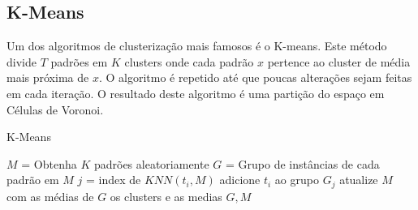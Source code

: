 \subsection{K-Means}
\label{subsec:teoria-kmeans}

Um dos algoritmos de clusterização mais famosos é o K-means. Este método divide $T$ padrões em $K$ clusters onde cada padrão $x$ pertence ao cluster de média mais próxima de $x$. O algoritmo é repetido até que poucas alterações sejam feitas em cada iteração. O resultado deste algoritmo é uma partição do espaço em Células de Voronoi.

\begin{algorithm}[H]
\caption{K-Means}
\label{alg:kmeans}
\begin{algorithmic}[1]
\STATE  $M$ = Obtenha $K$ padrões aleatoriamente
\STATE  $G$ = Grupo de instâncias de cada padrão em $M$
\STATE  $j$ = index de $KNN(t_i, M)$
\STATE  adicione $t_i$ ao grupo $G_j$
\ENDFOR
\STATE atualize $M$ com as médias de $G$
\ENDWHILE
\RETURN os clusters e as medias $G, M$
\end{algorithmic}
\end{algorithm}



